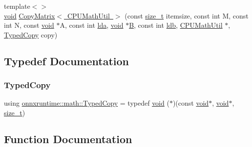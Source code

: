 \begin{DoxyCompactItemize}
\item 
{\footnotesize template$<$$>$ }\\\mbox{\hyperlink{mlasi_8h_a88f941d423cb2a819b70a1358982b1a6}{void}} \mbox{\hyperlink{namespaceonnxruntime_1_1math_a0cdbbd78e474c1bbbfae1e907f5b42be}{Copy\+Matrix$<$ C\+P\+U\+Math\+Util $>$}} (const \mbox{\hyperlink{mlasi_8h_a503efbc1c6e50825320ad909366b78ab}{size\+\_\+t}} itemsize, const int M, const int N, const \mbox{\hyperlink{mlasi_8h_a88f941d423cb2a819b70a1358982b1a6}{void}} $\ast$A, const int \mbox{\hyperlink{mlasi_8h_a38dd84f17dbd65aaf9f618e5c3ec496f}{lda}}, \mbox{\hyperlink{mlasi_8h_a88f941d423cb2a819b70a1358982b1a6}{void}} $\ast$\mbox{\hyperlink{mlasi_8h_a472f4360dfbf830e5135980ff43484b9}{B}}, const int \mbox{\hyperlink{mlasi_8h_a4431ce68ee01016a66896cedd34a57db}{ldb}}, \mbox{\hyperlink{classonnxruntime_1_1CPUMathUtil}{C\+P\+U\+Math\+Util}} $\ast$, \mbox{\hyperlink{namespaceonnxruntime_1_1math_a4fd61c06d9e9e1bc3ceb526787eab4e7}{Typed\+Copy}} copy)
\end{DoxyCompactItemize}


\subsection{Typedef Documentation}
\mbox{\label{namespaceonnxruntime_1_1math_a4fd61c06d9e9e1bc3ceb526787eab4e7}} 
\subsubsection{\texorpdfstring{Typed\+Copy}{TypedCopy}}
{\footnotesize\ttfamily using \mbox{\hyperlink{namespaceonnxruntime_1_1math_a4fd61c06d9e9e1bc3ceb526787eab4e7}{onnxruntime\+::math\+::\+Typed\+Copy}} = typedef \mbox{\hyperlink{mlasi_8h_a88f941d423cb2a819b70a1358982b1a6}{void}} ($\ast$)(const \mbox{\hyperlink{mlasi_8h_a88f941d423cb2a819b70a1358982b1a6}{void}}$\ast$, \mbox{\hyperlink{mlasi_8h_a88f941d423cb2a819b70a1358982b1a6}{void}}$\ast$, \mbox{\hyperlink{mlasi_8h_a503efbc1c6e50825320ad909366b78ab}{size\+\_\+t}})}



\subsection{Function Documentation}
\mbox{\label{namespaceonnxruntime_1_1math_a8988cb42d57c2365657e6a803b16ec7d}} 
